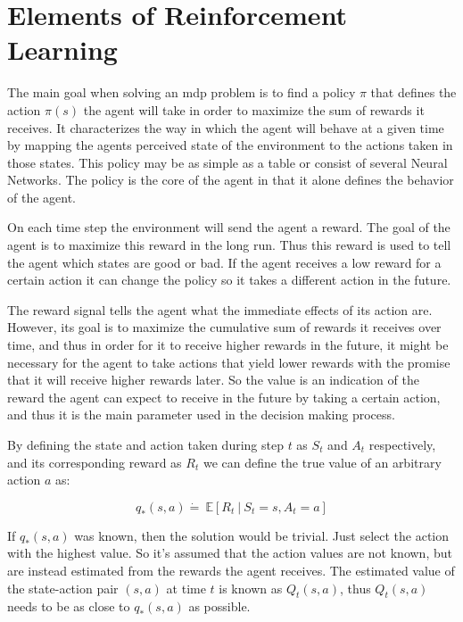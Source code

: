 \section{Elements of Reinforcement Learning}

The main goal when solving an \gls{mdp} problem is to find a policy $\pi$ that defines the action $\pi\left(s\right)$ the agent will take in order to maximize the sum of rewards it receives. It characterizes the way in which the agent will behave at a given time by mapping the agents perceived state of the environment to the actions taken in those states. This policy may be as simple as a table or consist of several Neural Networks. The policy is the core of the agent in that it alone defines the behavior of the agent.

On each time step the environment will send the agent a reward. The goal of the agent is to maximize this reward in the long run. Thus this reward is used to tell the agent which states are good or bad. If the agent receives a low reward for a certain action it can change the policy so it takes a different action in the future.

The reward signal tells the agent what the immediate effects of its action are. However, its goal is to maximize the cumulative sum of rewards it receives over time, and thus in order for it to receive higher rewards in the future, it might be necessary for the agent to take actions that yield lower rewards with the promise that it will receive higher rewards later. So the value is an indication of the reward the agent can expect to receive in the future by taking a certain action, and thus it is the main parameter used in the decision making process. 

By defining the state and action taken during step $t$ as $S_t$ and $A_t$ respectively, and its corresponding reward as $R_t$ we can define the true value of an arbitrary action $a$ as:

\begin{equation}
  q_*\left (s, a \right )\dot{=}\ \mathbb{E}\left[R_t\ |\ S_t=s, A_t=a \right ]
\end{equation}

If $q_*(s, a)$ was known, then the solution would be trivial. Just select the action with the highest value. So it's assumed that the action values are not known, but are instead estimated from the rewards the agent receives. The estimated value of the state-action pair $(s, a)$ at time $t$ is known as $Q_t(s, a)$, thus $Q_t(s, a)$ needs to be as close to $q_*(s, a)$ as possible.


